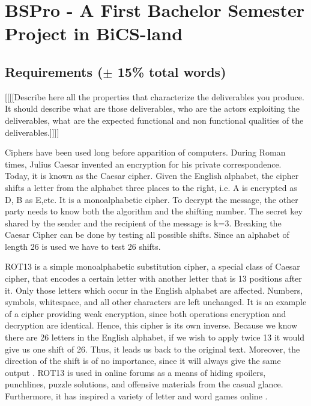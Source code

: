 \section{BSPro - A First Bachelor Semester Project in BiCS-land}
\subsection{Requirements ($\pm$ 15\% total words)}
[[[[Describe here all the properties that characterize the deliverables you produce. It should describe what are those deliverables, who are the actors exploiting the deliverables, what are the expected functional and non functional qualities of the deliverables.]]]]

Ciphers have been used long before apparition of computers. During Roman times, Julius Caesar invented an encryption for his private correspondence. Today, it is known as the Caesar cipher. Given the English alphabet, the cipher shifts a letter from the alphabet three places to the right, i.e. A is encrypted as D, B as E,etc. It is a monoalphabetic cipher. To decrypt the message, the other party needs to know both the algorithm and the shifting number. The secret key shared by the sender and the recipient of the message is k=3. Breaking the Caesar Cipher can be done by testing all possible shifts. Since an alphabet of length 26 is used we have to test 26 shifts. 

ROT13 is a simple monoalphabetic substitution cipher, a special class of Caesar cipher, that encodes a certain letter with another letter that is 13 positions after it. Only those letters which occur in the English alphabet are affected. Numbers, symbols, whitespace, and all other characters are left unchanged. It is an example of a cipher providing weak encryption, since both operations encryption and decryption are identical. Hence, this cipher is its own inverse. Because we know there are 26 letters in the English alphabet, if we wish to apply twice 13 it would give us one shift of 26. Thus, it leads us back to the original text. Moreover, the direction of the shift is of no importance, since it will always give the same output \cite{swenson2008modern}.
ROT13 is used in online forums as a means of hiding spoilers, punchlines, puzzle solutions, and offensive materials from the casual glance. Furthermore, it has inspired a variety of letter and word games online \cite{wikirot13}. 


